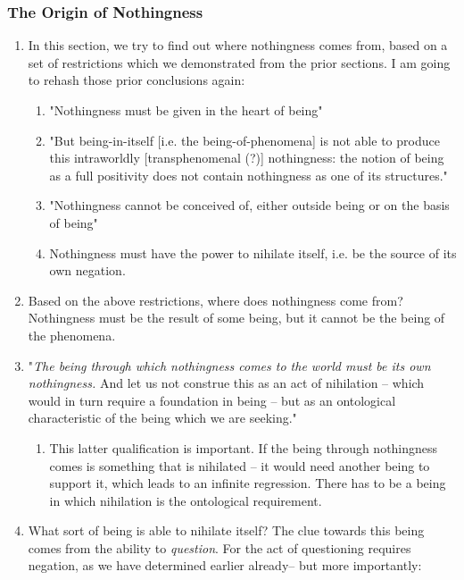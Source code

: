 \subsubsection{The Origin of Nothingness}

\begin{enumerate}
  \subsubsection*{The Origin of Nothingness in the Human Being}
  \item In this section, we try to find out where nothingness comes from, based on a set of restrictions which we demonstrated from the prior sections. I am going to rehash those prior conclusions again:
  \begin{enumerate}
    \item "Nothingness must be given in the heart of being"
    \item "But being-in-itself [i.e. the being-of-phenomena] is not able to produce this intraworldly [transphenomenal (?)] nothingness: the notion of being as a full positivity does not contain nothingness as one of its structures."
    \item "Nothingness cannot be conceived of, either outside being or on the basis of being" \autocite[57]{sartre}
    \item Nothingness must have the power to nihilate itself, i.e. be the source of its own negation.
  \end{enumerate}
  \item Based on the above restrictions, where does nothingness come from? Nothingness must be the result of some being, but it cannot be the being of the phenomena.
  \item "\emph{The being through which nothingness comes to the world must be its own nothingness.} And let us not construe this as an act of nihilation -- which would in turn require a foundation in being -- but as an ontological characteristic of the being which we are seeking."
  \begin{enumerate}
    \item This latter qualification is important. If the being through nothingness comes is something that is nihilated -- it would need another being to support it, which leads to an infinite regression. There has to be a being in which nihilation is the ontological requirement.
  \end{enumerate}
  \item What sort of being is able to nihilate itself? The clue towards this being comes from the ability to \emph{question}. For the act of questioning requires negation, as we have determined earlier already-- but more importantly:

\end{enumerate}
